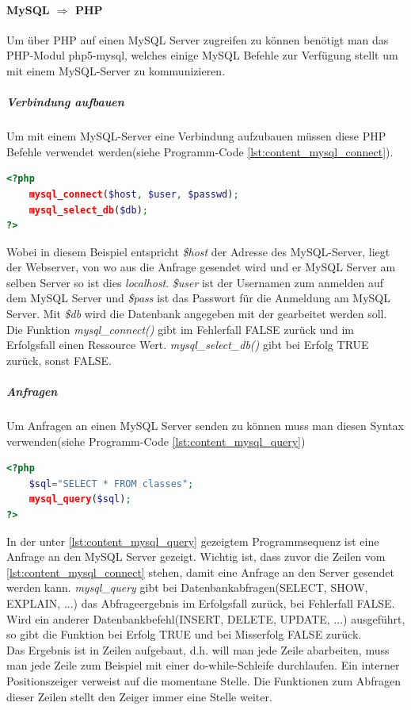 \paragraph{MySQL $ \Rightarrow $ PHP}
Um über PHP auf einen MySQL Server zugreifen zu können benötigt man das PHP-Modul php5-mysql, welches einige MySQL Befehle zur Verfügung stellt um mit einem MySQL-Server zu kommunizieren.\\
\subparagraph{Verbindung aufbauen}
Um mit einem MySQL-Server eine Verbindung aufzubauen müssen diese PHP Befehle verwendet werden(siehe Programm-Code \ref{lst:content_mysql_connect}).
\begin{lstlisting}[style=custom, language=PHP, caption={MySQL Connect},label={lst:content_mysql_connect}]
<?php 
	mysql_connect($host, $user, $passwd);
	mysql_select_db($db);
?>
\end{lstlisting}
Wobei in diesem Beispiel entspricht \textit{\$host} der Adresse des MySQL-Server, liegt der Webserver, von wo aus die Anfrage gesendet wird und er MySQL Server am selben Server so ist dies \textit{localhost}. \textit{\$user} ist der Usernamen zum anmelden auf dem MySQL Server und \textit{\$pass} ist das Passwort für die Anmeldung am MySQL Server. Mit \textit{\$db} wird die Datenbank angegeben mit der gearbeitet werden soll. Die Funktion \textit{mysql\_connect()} gibt im Fehlerfall FALSE zurück und im Erfolgsfall einen Ressource Wert. \textit{mysql\_select\_db()} gibt bei Erfolg TRUE zurück, sonst FALSE.
\subparagraph{Anfragen}
Um Anfragen an einen MySQL Server senden zu können muss man diesen Syntax verwenden(siehe Programm-Code \ref{lst:content_mysql_query})
\begin{lstlisting}[style=custom, language=PHP, caption={MySQL Querys},label={lst:content_mysql_query}]
<?php 
	$sql="SELECT * FROM classes";
	mysql_query($sql);
?>
\end{lstlisting}
In der unter \ref{lst:content_mysql_query} gezeigtem Programmsequenz ist eine Anfrage an den MySQL Server gezeigt. Wichtig ist, dass zuvor die Zeilen vom \autoref{lst:content_mysql_connect} stehen, damit eine Anfrage an den Server gesendet werden kann. \textit{mysql\_query} gibt bei Datenbankabfragen(SELECT, SHOW, EXPLAIN, ...) das Abfrageergebnis im Erfolgsfall zurück, bei Fehlerfall FALSE. Wird ein anderer Datenbankbefehl(INSERT, DELETE, UPDATE, ...) ausgeführt, so gibt die Funktion bei Erfolg TRUE und bei Misserfolg FALSE zurück.\\
Das Ergebnis ist in Zeilen aufgebaut, d.h. will man jede Zeile abarbeiten, muss man jede Zeile zum Beispiel mit einer do-while-Schleife durchlaufen. Ein interner Positionszeiger verweist auf die momentane Stelle. Die Funktionen zum Abfragen dieser Zeilen stellt den Zeiger immer eine Stelle weiter.\\
